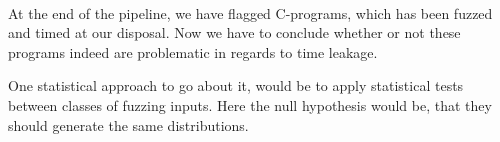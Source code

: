 \\
At the end of the pipeline, we have flagged C-programs, which has been fuzzed and timed at our disposal. Now we have to conclude whether or not these programs indeed are problematic in regards to time leakage.

One statistical approach to go about it, would be to apply statistical tests between classes of fuzzing inputs. Here the null hypothesis would be, that they should generate the same distributions. 


